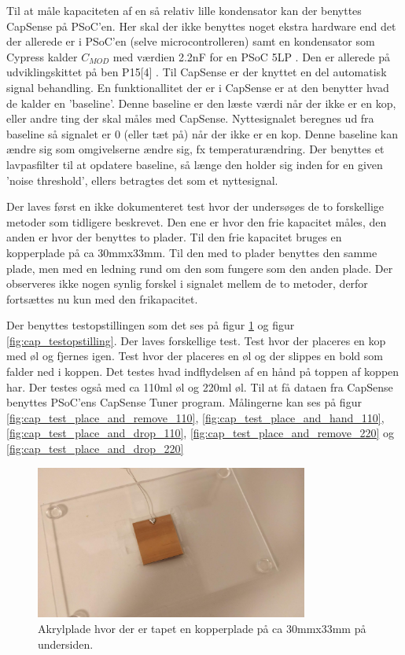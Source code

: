 \documentclass[HardwareDesign/HardwareDesign_main.tex]{subfiles}
\begin{document}
Til at måle kapaciteten af en så relativ lille kondensator kan der benyttes CapSense på PSoC'en. Her skal der ikke benyttes noget ekstra hardware end det der allerede er i PSoC'en (selve microcontrolleren) samt en kondensator som Cypress kalder $C_{MOD}$ med værdien 2.2nF for en PSoC 5LP \autocite[115]{AN64846}. Den er allerede på udviklingskittet på ben P15[4] \autocite[2]{PSoCKitSchematics}. Til CapSense er der knyttet en del automatisk signal behandling. En funktionallitet der er i CapSense er at den benytter hvad de kalder en 'baseline'\autocite[18]{AN64846}. Denne baseline er den læste værdi når der ikke er en kop, eller andre ting der skal måles med CapSense. Nyttesignalet beregnes ud fra baseline så signalet er 0 (eller tæt på) når der ikke er en kop. Denne baseline kan ændre sig som omgivelserne ændre sig, fx temperaturændring. Der benyttes et lavpasfilter til at opdatere baseline, så længe den holder sig inden for en given 'noise threshold', ellers betragtes det som et nyttesignal.

Der laves først en ikke dokumenteret test hvor der undersøges de to forskellige metoder som tidligere beskrevet. Den ene er hvor den frie kapacitet måles, den anden er hvor der benyttes to plader. Til den frie kapacitet bruges en kopperplade på ca 30mmx33mm. Til den med to plader benyttes den samme plade, men med en ledning rund om den som fungere som den anden plade. Der observeres ikke nogen synlig forskel i signalet mellem de to metoder, derfor fortsættes nu kun med den frikapacitet.

Der benyttes testopstillingen som det ses på figur \ref{fig:cap_tape_testopstilling} og figur \ref{fig:cap_testopstilling}. 
Der laves forskellige test. Test hvor der placeres en kop med øl og fjernes igen. Test hvor der placeres en øl og der slippes en bold som falder ned i koppen. Det testes hvad indflydelsen af en hånd på toppen af koppen har. Der testes også med ca 110ml øl og 220ml øl. Til at få dataen fra CapSense benyttes PSoC'ens CapSense Tuner program. Målingerne kan ses på figur \ref{fig:cap_test_place_and_remove_110}, \ref{fig:cap_test_place_and_hand_110}, \ref{fig:cap_test_place_and_drop_110}, \ref{fig:cap_test_place_and_remove_220} og \ref{fig:cap_test_place_and_drop_220}


\begin{figure}[H]
    \centering
    \includegraphics[width=0.8\textwidth]{HardwareDesign/CupSensor/graphics/CapTest/tape_plate.jpg}
    \caption{Akrylplade hvor der er tapet en kopperplade på ca 30mmx33mm på undersiden.}
    \label{fig:cap_tape_testopstilling}
\end{figure}
\end{document}
